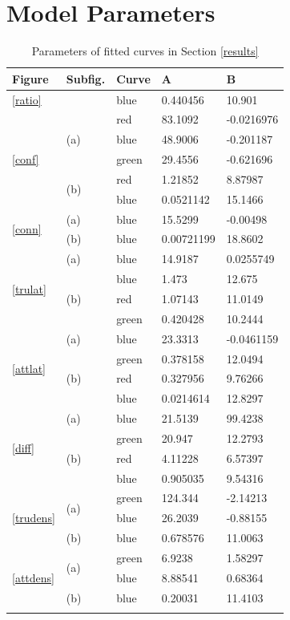 \documentclass[a4paper,12pt,twoside]{report}
\begin{document}
\chapter{Model Parameters} \label{modelparams}
\begin{longtable}{|l|l|l|l|l|}
\hline
Figure & Subfig. & Curve & A & B \\ \hline
\ref{ratio}					&					   & blue & 0.440456 & 10.901 \\ \hline
\multirow{5}{*}{\ref{conf}} & \multirow{3}{*}{(a)} & red & 83.1092 & -0.0216976 \\
 							& 					   & blue & 48.9006 & -0.201187 \\
 							& 					   & green & 29.4556 & -0.621696 \\ \cline{2-5}	
 							& \multirow{2}{*}{(b)} & red & 1.21852 & 8.87987 \\
 							& 					   & blue & 0.0521142 & 15.1466 \\ \hline
\multirow{2}{*}{\ref{conn}} & (a) & blue & 15.5299 & -0.00498 \\ \cline{2-4}	
 							& (b) & blue & 0.00721199 & 18.8602 \\ \hline
\multirow{4}{*}{\ref{trulat}} & (a)				   & blue & 14.9187 & 0.0255749 \\ \cline{2-5}	
 							& \multirow{3}{*}{(b)} & blue & 1.473 & 12.675 \\
 							& 					   & red & 1.07143 & 11.0149 \\ 
 							& 					   & green & 0.420428 & 10.2444 \\ \hline
\multirow{4}{*}{\ref{attlat}} & (a)				   & blue & 23.3313 & -0.0461159 \\ \cline{2-5}	
 							& \multirow{3}{*}{(b)} & green & 0.378158 & 12.0494 \\
 							& 					   & red & 0.327956 & 9.76266 \\ 
 							& 					   & blue & 0.0214614 & 12.8297 \\ \hline
\multirow{4}{*}{\ref{diff}} & (a)				   & blue & 21.5139 & 99.4238 \\ \cline{2-5}	
 							& \multirow{3}{*}{(b)} & green & 20.947 & 12.2793 \\
 							& 					   & red & 4.11228 & 6.57397 \\ 
 							& 					   & blue & 0.905035 & 9.54316 \\ \hline
\multirow{3}{*}{\ref{trudens}} & \multirow{2}{*}{(a)} & green & 124.344 & -2.14213 \\
 							& 					   & blue & 26.2039 & -0.88155 \\ \cline{2-5}	
 							& (b)				   & blue & 0.678576 & 11.0063 \\ \hline
\multirow{3}{*}{\ref{attdens}} & \multirow{2}{*}{(a)} & green & 6.9238 & 1.58297 \\
 							& 					   & blue & 8.88541 & 0.68364 \\ \cline{2-5}	
 							& (b)				   & blue & 0.20031 & 11.4103 \\ \hline
\caption{Parameters of fitted curves in Section \ref{results}}
\end{longtable}
\clearpage

\listoffigures
\clearpage

\listoftables
\clearpage



\end{document}
